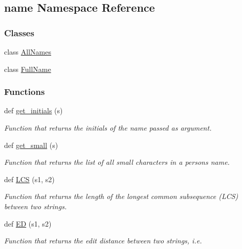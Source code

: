 \hypertarget{namespacename}{}\subsection{name Namespace Reference}
\label{namespacename}
\subsubsection*{Classes}
\begin{DoxyCompactItemize}
\item 
class \hyperlink{classname_1_1AllNames}{All\+Names}
\item 
class \hyperlink{classname_1_1FullName}{Full\+Name}
\end{DoxyCompactItemize}
\subsubsection*{Functions}
\begin{DoxyCompactItemize}
\item 
def \hyperlink{namespacename_aac6586237940f09049413cfc51952677}{get\+\_\+initials} (s)
\begin{DoxyCompactList}\small\item\em Function that returns the initials of the name passed as argument. \end{DoxyCompactList}\item 
def \hyperlink{namespacename_aea030be0c4aba39c00144f53b219b5fb}{get\+\_\+small} (s)
\begin{DoxyCompactList}\small\item\em Function that returns the list of all small characters in a person\textquotesingle{}s name. \end{DoxyCompactList}\item 
def \hyperlink{namespacename_a662ec0d5b529dcd09fe92f4011739422}{L\+CS} (s1, s2)
\begin{DoxyCompactList}\small\item\em Function that returns the length of the longest common subsequence (L\+CS) between two strings. \end{DoxyCompactList}\item 
def \hyperlink{namespacename_aaf6a02e97478e39abbec27e09d4d3fc7}{ED} (s1, s2)
\begin{DoxyCompactList}\small\item\em Function that returns the edit distance between two strings, i.\+e. \end{DoxyCompactList}\end{DoxyCompactItemize}
